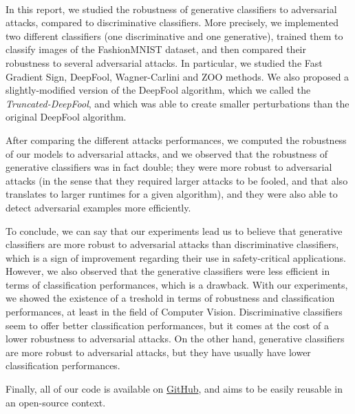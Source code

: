 \documentclass[10pt,twocolumn,letterpaper]{article}
\begin{document}
\paragraph{} In this report, we studied the robustness of generative classifiers to adversarial attacks, compared to discriminative classifiers. More precisely, we implemented two different classifiers (one discriminative and one generative), trained them to classify images of the FashionMNIST dataset, and then compared their robustness to several adversarial attacks. In particular, we studied the Fast Gradient Sign, DeepFool, Wagner-Carlini and ZOO methods. We also proposed a slightly-modified version of the DeepFool algorithm, which we called the \textit{Truncated-DeepFool}, and which was able to create smaller perturbations than the original DeepFool algorithm.

After comparing the different attacks performances, we computed the robustness of our models to adversarial attacks, and we observed that the robustness of generative classifiers was in fact double; they were more robust to adversarial attacks (in the sense that they required larger attacks to be fooled, and that also translates to larger runtimes for a given algorithm), and they were also able to detect adversarial examples more efficiently.

To conclude, we can say that our experiments lead us to believe that generative classifiers are more robust to adversarial attacks than discriminative classifiers, which is a sign of improvement regarding their use in safety-critical applications. However, we also observed that the generative classifiers were less efficient in terms of classification performances, which is a drawback. With our experiments, we showed the existence of a treshold in terms of robustness and classification performances, at least in the field of Computer Vision. Discriminative classifiers seem to offer better classification performances, but it comes at the cost of a lower robustness to adversarial attacks. On the other hand, generative classifiers are more robust to adversarial attacks, but they have usually have lower classification performances. 

Finally, all of our code is available on \href{https://github.com/paulbarbier/adversarial-attacks-on-generative-classifiers}{GitHub}, and aims to be easily reusable in an open-source context.

\quad
\newpage 
\newpage
{\small


}
\end{document}
